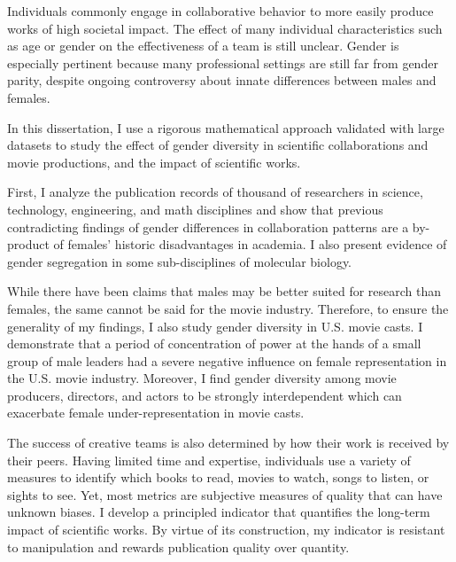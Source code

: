 Individuals commonly engage in collaborative behavior to more easily produce works of high societal impact. The effect of many individual characteristics such as age or gender on the effectiveness of a team is still unclear. Gender is especially pertinent because many professional settings are still far from gender parity, despite ongoing controversy about innate differences between males and females.

In this dissertation, I use a rigorous mathematical approach validated with large datasets to study the effect of gender diversity in scientific collaborations and movie productions, and the impact of scientific works.

First, I analyze the publication records of thousand of researchers in science, technology, engineering, and math disciplines and show that previous contradicting findings of gender differences in collaboration patterns are a by-product of females' historic disadvantages in academia. I also present evidence of gender segregation in some sub-disciplines of molecular biology.

While there have been claims that males may be better suited for research than females, the same cannot be said for the movie industry. Therefore, to ensure the generality of my findings, I also study gender diversity in U.S. movie casts. I demonstrate that a period of concentration of power at the hands of a small group of male leaders had a severe negative influence on female representation in the U.S. movie industry. Moreover, I find gender diversity among movie producers, directors, and actors to be strongly interdependent which can exacerbate female under-representation in movie casts.

The success of creative teams is also determined by how their work is received by their peers. Having limited time and expertise, individuals use a variety of measures to identify which books to read, movies to watch, songs to listen, or sights to see. Yet, most metrics are subjective measures of quality that can have unknown biases. I develop a principled indicator that quantifies the long-term impact of scientific works. By virtue of its construction, my indicator is resistant to manipulation and rewards publication quality over quantity.
